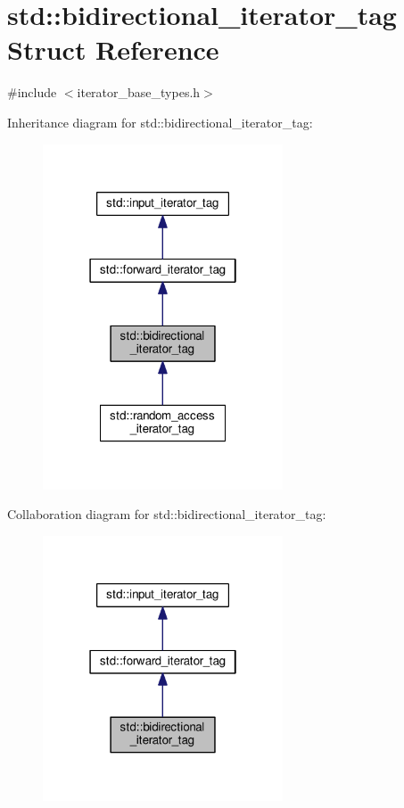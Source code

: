 \hypertarget{structstd_1_1bidirectional__iterator__tag}{}\section{std\+:\+:bidirectional\+\_\+iterator\+\_\+tag Struct Reference}
\label{structstd_1_1bidirectional__iterator__tag}


{\ttfamily \#include $<$iterator\+\_\+base\+\_\+types.\+h$>$}



Inheritance diagram for std\+:\+:bidirectional\+\_\+iterator\+\_\+tag\+:
\nopagebreak
\begin{figure}[H]
\begin{center}
\leavevmode
\includegraphics[width=202pt]{structstd_1_1bidirectional__iterator__tag__inherit__graph}
\end{center}
\end{figure}


Collaboration diagram for std\+:\+:bidirectional\+\_\+iterator\+\_\+tag\+:
\nopagebreak
\begin{figure}[H]
\begin{center}
\leavevmode
\includegraphics[width=202pt]{structstd_1_1bidirectional__iterator__tag__coll__graph}
\end{center}
\end{figure}


